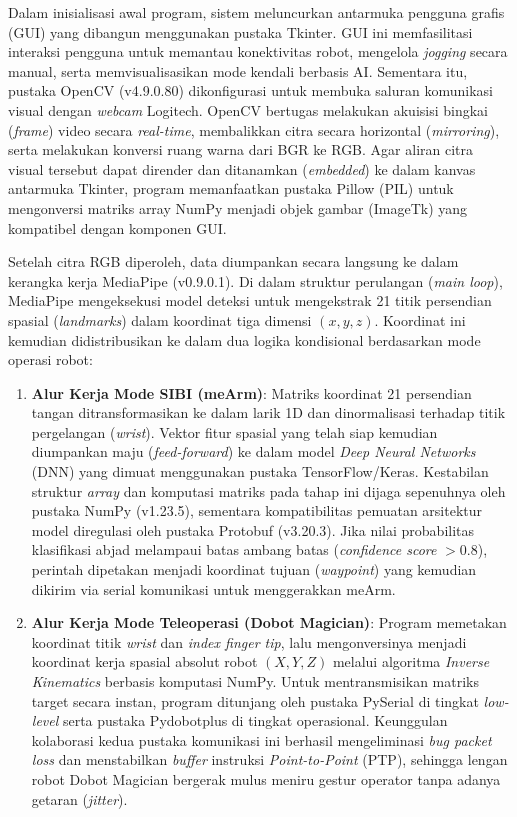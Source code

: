 Dalam inisialisasi awal program, sistem meluncurkan antarmuka pengguna grafis (GUI) yang dibangun menggunakan pustaka Tkinter. GUI ini memfasilitasi interaksi pengguna untuk memantau konektivitas robot, mengelola \textit{jogging} secara manual, serta memvisualisasikan mode kendali berbasis AI. Sementara itu, pustaka OpenCV (v4.9.0.80) dikonfigurasi untuk membuka saluran komunikasi visual dengan \textit{webcam} Logitech. OpenCV bertugas melakukan akuisisi bingkai (\textit{frame}) video secara \textit{real-time}, membalikkan citra secara horizontal (\textit{mirroring}), serta melakukan konversi ruang warna dari BGR ke RGB. Agar aliran citra visual tersebut dapat dirender dan ditanamkan (\textit{embedded}) ke dalam kanvas antarmuka Tkinter, program memanfaatkan pustaka Pillow (PIL) untuk mengonversi matriks array NumPy menjadi objek gambar (ImageTk) yang kompatibel dengan komponen GUI.

Setelah citra RGB diperoleh, data diumpankan secara langsung ke dalam kerangka kerja MediaPipe (v0.9.0.1). Di dalam struktur perulangan (\textit{main loop}), MediaPipe mengeksekusi model deteksi untuk mengekstrak 21 titik persendian spasial (\textit{landmarks}) dalam koordinat tiga dimensi $(x,y,z)$. Koordinat ini kemudian didistribusikan ke dalam dua logika kondisional berdasarkan mode operasi robot:

\begin{enumerate}[label=\arabic*.]
    \item \textbf{Alur Kerja Mode SIBI (meArm)}: Matriks koordinat 21 persendian tangan ditransformasikan ke dalam larik 1D dan dinormalisasi terhadap titik pergelangan (\textit{wrist}). Vektor fitur spasial yang telah siap kemudian diumpankan maju (\textit{feed-forward}) ke dalam model \textit{Deep Neural Networks} (DNN) yang dimuat menggunakan pustaka TensorFlow/Keras. Kestabilan struktur \textit{array} dan komputasi matriks pada tahap ini dijaga sepenuhnya oleh pustaka NumPy (v1.23.5), sementara kompatibilitas pemuatan arsitektur model diregulasi oleh pustaka Protobuf (v3.20.3). Jika nilai probabilitas klasifikasi abjad melampaui batas ambang batas (\textit{confidence score} $> 0.8$), perintah dipetakan menjadi koordinat tujuan (\textit{waypoint}) yang kemudian dikirim via serial komunikasi untuk menggerakkan meArm.
    \item \textbf{Alur Kerja Mode Teleoperasi (Dobot Magician)}: Program memetakan koordinat titik \textit{wrist} dan \textit{index finger tip}, lalu mengonversinya menjadi koordinat kerja spasial absolut robot $(X,Y,Z)$ melalui algoritma \textit{Inverse Kinematics} berbasis komputasi NumPy. Untuk mentransmisikan matriks target secara instan, program ditunjang oleh pustaka PySerial di tingkat \textit{low-level} serta pustaka Pydobotplus di tingkat operasional. Keunggulan kolaborasi kedua pustaka komunikasi ini berhasil mengeliminasi \textit{bug packet loss} dan menstabilkan \textit{buffer} instruksi \textit{Point-to-Point} (PTP), sehingga lengan robot Dobot Magician bergerak mulus meniru gestur operator tanpa adanya getaran (\textit{jitter}).
\end{enumerate}

